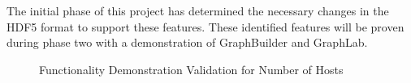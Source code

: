 \documentclass[conference]{IEEEtran} \pdfpagewidth=8.5in
\begin{document}
The initial phase of this project has determined the necessary changes in the
HDF5 format to support these features. These identified features will be
proven during phase two with a demonstration of GraphBuilder and GraphLab.

\begin{figure}[htbp!]
\centering
\caption{Functionality Demonstration Validation for Number of Hosts}
\label{fig:eval-hosts}
\end{figure}
\end{document}
